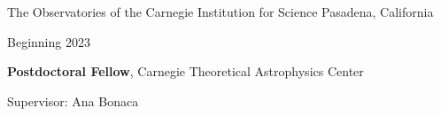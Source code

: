 \documentclass[cv.tex]{subfiles}
\begin{document}
{\color{themecolor} \large
The Observatories of the Carnegie Institution for Science
}
\hfill
Pasadena, California
\par\noindent
\parbox{0.18\textwidth}{%
	\raggedleft
	Beginning 2023 \par
	\null
}
\hspace{1mm}
\parbox{0.8\textwidth}{%
	\vspace{1mm}
	\textbf{Postdoctoral Fellow}, Carnegie Theoretical Astrophysics Center \par
	Supervisor: Ana Bonaca
}
\end{document}
